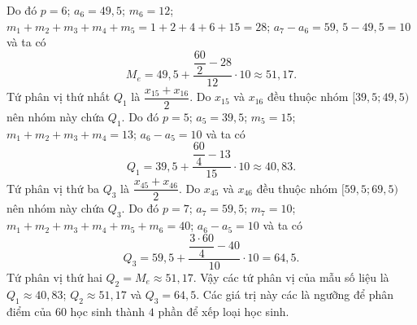 \begin{ex}
{		Do đó $p=6$; $a_6=49,5$; $m_6=12$; $m_1+m_2+m_3+m_4+m_5=1+2+4+6+15=28$; $a_7-a_6=59$, $5-49,5=10$ và ta có  \[M_e=49{,}5+\dfrac{\dfrac{60}{2}-28}{12}\cdot10\approx 51{,}17.\]
		Tứ phân vị thứ nhất $Q_1$ là $\dfrac{x_{15}+x_{16}}{2}$. Do $x_{15}$ và $x_{16}$ đều thuộc nhóm $[39,5;49,5)$ nên nhóm này chứa $Q_1$. Do đó $p=5$; $a_5=39,5$; $m_5=15$; $m_1+m_2+m_3+m_4=13$; $a_6-a_5=10$ và  ta có \[Q_1=39,5+\dfrac{\dfrac{60}{4}-13}{15}\cdot10\approx 40{,}83.\]
		Tứ phân vị thứ ba $Q_3$ là $\dfrac{x_{45}+x_{46}}{2}$. Do $x_{45}$ và $x_{46}$ đều thuộc nhóm $[59,5;69,5)$ nên nhóm này chứa $Q_3$. Do  đó $p=7$; $a_7=59,5$; $m_7=10$; $m_1+m_2+m_3+m_4+m_5+m_6=40$; $a_6-a_5=10$ và ta có \[Q_3=59,5+\dfrac{\dfrac{3\cdot60}{4}-40}{10}\cdot10=64{,}5.\]
		Tứ phân  vị thứ hai $Q_2=M_e \approx 51{,}17.$
		Vậy các tứ phân vị của mẫu số liệu là $Q_1 \approx 40{,}83$; $Q_2 \approx 51{,}17$ và $Q_3=64{,}5$.  Các giá trị này các là ngưỡng để phân điểm của $60$ học sinh thành $4$ phần để xếp loại học sinh.
	} 
\end{ex}

